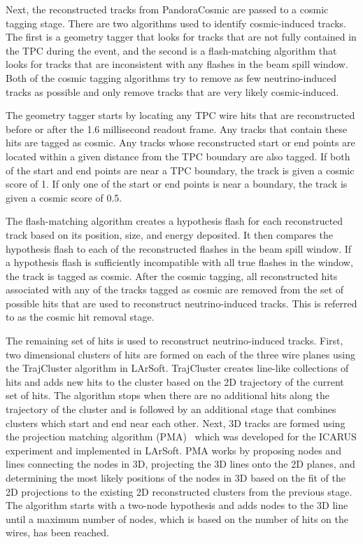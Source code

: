     Next, the reconstructed tracks from PandoraCosmic are passed to a cosmic
    tagging stage. There are two algorithms used to identify cosmic-induced
    tracks. The first is a geometry tagger that looks for tracks that are not
    fully contained in the TPC during the event, and the second is a
    flash-matching algorithm that looks for tracks that are inconsistent with
    any flashes in the beam spill window. Both of the cosmic tagging algorithms
    try to remove as few neutrino-induced tracks as possible and only remove
    tracks that are very likely cosmic-induced.
    
    The geometry tagger starts by locating any TPC wire hits that are
    reconstructed before or after the 1.6 millisecond readout frame. Any tracks
    that contain these hits are tagged as cosmic. Any tracks whose
    reconstructed start or end points are located within a given distance from
    the TPC boundary are also tagged. If both of the start and end points are
    near a TPC boundary, the track is given a cosmic score of 1. If only one of
    the start or end points is near a boundary, the track is given a cosmic
    score of 0.5.
    
    The flash-matching algorithm creates a hypothesis flash for each
    reconstructed track based on its position, size, and energy deposited. It
    then compares the hypothesis flash to each of the reconstructed flashes in
    the beam spill window. If a hypothesis flash is sufficiently incompatible
    with all true flashes in the window, the track is tagged as cosmic. After
    the cosmic tagging, all reconstructed hits associated with any of the
    tracks tagged as cosmic are removed from the set of possible hits that are
    used to reconstruct neutrino-induced tracks. This is referred to as the
    cosmic hit removal stage.

    The remaining set of hits is used to reconstruct neutrino-induced tracks.
    First, two dimensional clusters of hits are formed on each of the three
    wire planes using the TrajCluster algorithm in LArSoft. TrajCluster creates
    line-like collections of hits and adds new hits to the cluster based on the
    2D trajectory of the current set of hits.  The algorithm stops when there
    are no additional hits along the trajectory of the cluster and is followed
    by an additional stage that combines clusters which start and end near each
    other. Next, 3D tracks are formed using the projection matching algorithm
    (PMA)~\cite{Antonello:2012hu} which was developed for the ICARUS experiment
    and implemented in LArSoft. PMA works by proposing nodes and lines
    connecting the nodes in 3D, projecting the 3D lines onto the 2D planes, and
    determining the most likely positions of the nodes in 3D based on the fit
    of the 2D projections to the existing 2D reconstructed clusters from the
    previous stage. The algorithm starts with a two-node hypothesis and adds
    nodes to the 3D line until a maximum number of nodes, which is based on the
    number of hits on the wires, has been reached.

